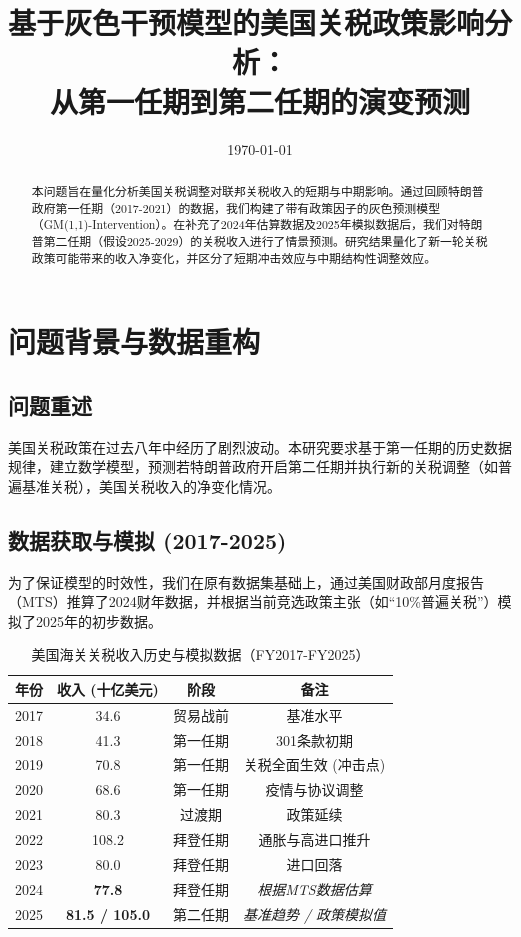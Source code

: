 \documentclass[a4paper,12pt]{article}
\title{\textbf{基于灰色干预模型的美国关税政策影响分析：\\从第一任期到第二任期的演变预测}}
\date{\today}
\begin{document}
\maketitle

\begin{abstract}
本问题旨在量化分析美国关税调整对联邦关税收入的短期与中期影响。通过回顾特朗普政府第一任期（2017-2021）的数据，我们构建了带有政策因子的灰色预测模型（GM(1,1)-Intervention）。在补充了2024年估算数据及2025年模拟数据后，我们对特朗普第二任期（假设2025-2029）的关税收入进行了情景预测。研究结果量化了新一轮关税政策可能带来的收入净变化，并区分了短期冲击效应与中期结构性调整效应。
\end{abstract}

\section{问题背景与数据重构}

\subsection{问题重述}
美国关税政策在过去八年中经历了剧烈波动。本研究要求基于第一任期的历史数据规律，建立数学模型，预测若特朗普政府开启第二任期并执行新的关税调整（如普遍基准关税），美国关税收入的净变化情况。

\subsection{数据获取与模拟 (2017-2025)}
为了保证模型的时效性，我们在原有数据集基础上，通过美国财政部月度报告（MTS）推算了2024财年数据，并根据当前竞选政策主张（如“10\%普遍关税”）模拟了2025年的初步数据。

\begin{table}[H]
    \centering
    \caption{美国海关关税收入历史与模拟数据（FY2017-FY2025）}
    \label{tab:full_data}
    \begin{tabular}{cccc}
        \toprule
        \textbf{年份} & \textbf{收入 (十亿美元)} & \textbf{阶段} & \textbf{备注} \\
        \midrule
        2017 & 34.6 & 贸易战前 & 基准水平 \\
        2018 & 41.3 & 第一任期 & 301条款初期 \\
        2019 & 70.8 & 第一任期 & 关税全面生效 (冲击点) \\
        2020 & 68.6 & 第一任期 & 疫情与协议调整 \\
        2021 & 80.3 & 过渡期 & 政策延续 \\
        2022 & 108.2 & 拜登任期 & 通胀与高进口推升 \\
        2023 & 80.0 & 拜登任期 & 进口回落 \\
        2024 & \textbf{77.8} & 拜登任期 & \textit{根据MTS数据估算} \\
        2025 & \textbf{81.5 / 105.0} & 第二任期 & \textit{基准趋势 / 政策模拟值} \\
        \bottomrule
    \end{tabular}
\end{table}
\end{document}
